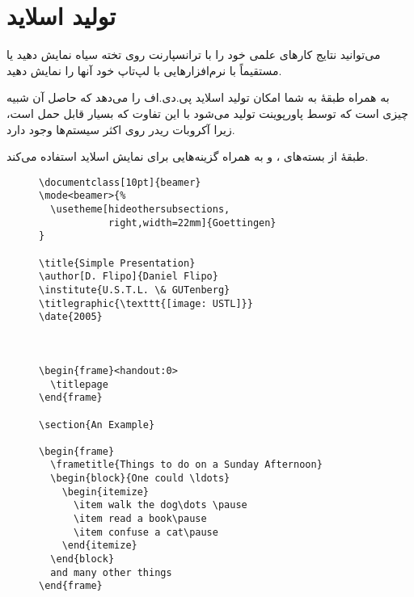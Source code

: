 {\section{تولید اسلاید}
\label{sec:beamer}
می‌توانید نتایج کارهای علمی خود را با ترانسپارنت روی تخته سیاه نمایش دهید یا مستقیماً با نرم‌افزارهایی با لپ‌تاپ خود آنها را نمایش دهید.

 به همراه طبقهٔ  به شما امکان تولید اسلاید پی.دی.اف را می‌دهد که حاصل آن شبیه چیزی است که توسط پاورپوینت تولید می‌شود با این تفاوت که بسیار قابل حمل است، زیرا آکروبات ریدر روی اکثر سیستم‌ها وجود دارد.

طبقهٔ  از بسته‌های ،  و  به همراه گزینه‌هایی برای نمایش اسلاید استفاده می‌کند.



\begin{figure}[htbp]
\setLR
\begin{verbatim}
\documentclass[10pt]{beamer}
\mode<beamer>{%
  \usetheme[hideothersubsections,
            right,width=22mm]{Goettingen}
}

\title{Simple Presentation}
\author[D. Flipo]{Daniel Flipo}
\institute{U.S.T.L. \& GUTenberg}
\titlegraphic{\texttt{[image: USTL]}}
\date{2005}



\begin{frame}<handout:0>
  \titlepage
\end{frame}

\section{An Example}

\begin{frame}
  \frametitle{Things to do on a Sunday Afternoon}
  \begin{block}{One could \ldots}
    \begin{itemize}
      \item walk the dog\dots \pause
      \item read a book\pause
      \item confuse a cat\pause
    \end{itemize}
  \end{block}
  and many other things 
\end{frame}


\end{verbatim}
\end{figure}}
